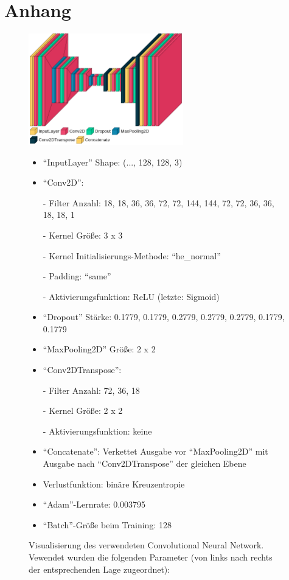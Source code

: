 \section*{Anhang}
\label{sec:Anhang}

\begin{figure}
    \centering
    \includegraphics[width=0.6\textwidth]{images/visual_model.png}
    \caption{Visualisierung des verwendeten Convolutional Neural Network.\\%
            Vewendet wurden die folgenden Parameter (von links nach rechts der entsprechenden Lage zugeordnet): \\}
    \label{fig:visual_model}
    \begin{itemize}%
        \item \enquote{InputLayer} Shape: (..., 128, 128, 3) %
        \item \enquote{Conv2D}:%
        \item[-] Filter Anzahl: 18, 18, 36, 36, 72, 72, 144, 144, 72, 72, 36, 36, 18, 18, 1%
        \item[-] Kernel Größe: 3 x 3%
        \item[-] Kernel Initialisierungs-Methode: \enquote{he\_normal}%
        \item[-] Padding: \enquote{same} %
        \item[-] Aktivierungsfunktion: ReLU (letzte: Sigmoid)%
        \item \enquote{Dropout} Stärke: 0.1779, 0.1779, 0.2779, 0.2779, 0.2779, 0.1779, 0.1779%
        \item \enquote{MaxPooling2D} Größe: 2 x 2%
        \item \enquote{Conv2DTranspose}:%
        \item[-] Filter Anzahl: 72, 36, 18%
        \item[-] Kernel Größe: 2 x 2%
        \item[-] Aktivierungsfunktion: keine%
        \item \enquote{Concatenate}: Verkettet Ausgabe vor \enquote{MaxPooling2D} mit Ausgabe nach \enquote{Conv2DTranspose} der gleichen Ebene%
        \item Verlustfunktion: binäre Kreuzentropie%
        \item \enquote{Adam}-Lernrate: 0.003795%
        \item \enquote{Batch}-Größe beim Training: 128%
    \end{itemize}
\end{figure}

